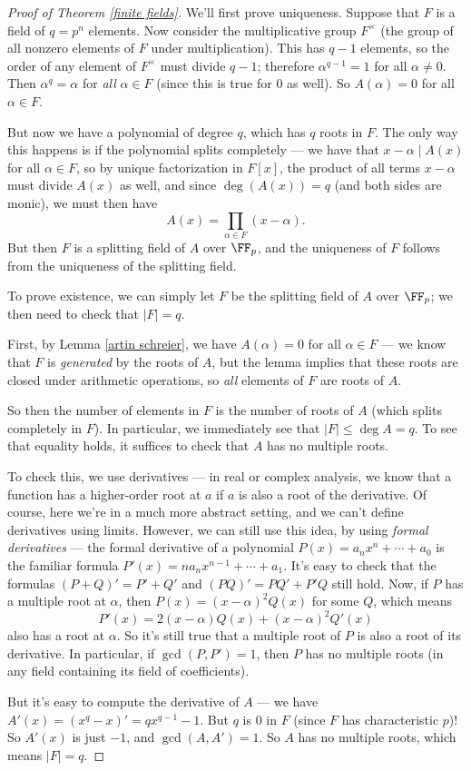 \begin{proof}[Proof of Theorem \ref{finite fields}]

We'll first prove uniqueness. Suppose that $F$ is a field of $q = p^n$ elements. Now consider the multiplicative group $F^\times$ (the group of all nonzero elements of $F$ under multiplication). This has $q - 1$ elements, so the order of any element of $F^\times$ must divide $q - 1$; therefore $\alpha^{q - 1} = 1$ for all $\alpha \neq 0$. Then $\alpha^q = \alpha$ for \emph{all} $\alpha \in F$ (since this is true for $0$ as well). So $A(\alpha) = 0$ for all $\alpha \in F$. 

But now we have a polynomial of degree $q$, which has $q$ roots in $F$. The only way this happens is if the polynomial splits completely --- we have that $x - \alpha \mid A(x)$ for all $\alpha \in F$, so by unique factorization in $F[x]$, the product of all terms $x - \alpha$ must divide $A(x)$ as well, and since $\deg(A(x)) = q$ (and both sides are monic), we must then have \[A(x) = \prod_{\alpha \in F} (x - \alpha).\] But then $F$ is a splitting field of $A$ over $\FF_p$, and the uniqueness of $F$ follows from the uniqueness of the splitting field. 

To prove existence, we can simply let $F$ be the splitting field of $A$ over $\FF_p$; we then need to check that $|F| = q$. 

First, by Lemma \ref{artin schreier}, we have $A(\alpha) = 0$ for all $\alpha \in F$ --- we know that $F$ is \emph{generated} by the roots of $A$, but the lemma implies that these roots are closed under arithmetic operations, so \emph{all} elements of $F$ are roots of $A$. 

So then the number of elements in $F$ is the number of roots of $A$ (which splits completely in $F$). In particular, we immediately see that $|F| \leq \deg A = q$. To see that equality holds, it suffices to check that $A$ has no multiple roots. 

To check this, we use derivatives --- in real or complex analysis, we know that a function has a higher-order root at $a$ if $a$ is also a root of the derivative. Of course, here we're in a much more abstract setting, and we can't define derivatives using limits. However, we can still use this idea, by using \emph{formal derivatives} --- the formal derivative of a polynomial $P(x) = a_nx^n + \cdots + a_0$ is the familiar formula $P'(x) = na_nx^{n - 1} + \cdots + a_1$. It's easy to check that the formulas $(P + Q)' = P' + Q'$ and $(PQ)' = PQ' + P'Q$ still hold. Now, if $P$ has a multiple root at $\alpha$, then $P(x) = (x - \alpha)^2Q(x)$ for some $Q$, which means \[P'(x) = 2(x - \alpha)Q(x) + (x - \alpha)^2Q'(x)\] also has a root at $\alpha$. So it's still true that a multiple root of $P$ is also a root of its derivative. In particular, if $\gcd(P, P') = 1$, then $P$ has no multiple roots (in any field containing its field of coefficients).

But it's easy to compute the derivative of $A$ --- we have $A'(x) = (x^q - x)' = qx^{q - 1} - 1$. But $q$ is $0$ in $F$ (since $F$ has characteristic $p$)! So $A'(x)$ is just $-1$, and $\gcd(A, A') = 1$. So $A$ has no multiple roots, which means $|F| = q$. 
\end{proof}

